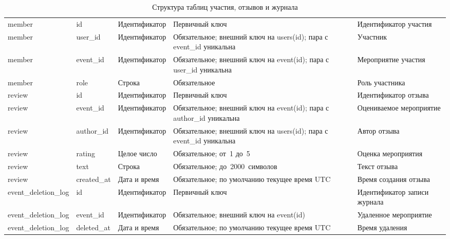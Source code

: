 \begin{table}[H]
    \caption{Структура таблиц участия, отзывов и журнала}
    \label{tab:design-actions}
    \small
    \begin{tabularx}{\textwidth}{|L{3.2cm}|L{2.8cm}|L{2.7cm}|Y|Y|}
        \hline
         &  &  &  &  \\
        \hline
        member & id & Идентификатор & Первичный ключ & Идентификатор участия \\
        \hline
        member & user\_id & Идентификатор & Обязательное; внешний ключ на users(id); пара с event\_id уникальна & Участник \\
        \hline
        member & event\_id & Идентификатор & Обязательное; внешний ключ на event(id); пара с user\_id уникальна & Мероприятие участия \\
        \hline
        member & role & Строка & Обязательное & Роль участника \\
        \hline
        review & id & Идентификатор & Первичный ключ & Идентификатор отзыва \\
        \hline
        review & event\_id & Идентификатор & Обязательное; внешний ключ на event(id); пара с author\_id уникальна & Оцениваемое мероприятие \\
        \hline
        review & author\_id & Идентификатор & Обязательное; внешний ключ на users(id); пара с event\_id уникальна & Автор отзыва \\
        \hline
        review & rating & Целое число & Обязательное; от~1 до~5 & Оценка мероприятия \\
        \hline
        review & text & Строка & Обязательное; до~2000~символов & Текст отзыва \\
        \hline
        review & created\_at & Дата и время & Обязательное; по умолчанию текущее время UTC & Время создания отзыва \\
        \hline
        event\_deletion\_log & id & Идентификатор & Первичный ключ & Идентификатор записи журнала \\
        \hline
        event\_deletion\_log & event\_id & Идентификатор & Обязательное; внешний ключ на event(id) & Удаленное мероприятие \\
        \hline
        event\_deletion\_log & deleted\_at & Дата и время & Обязательное; по умолчанию текущее время UTC & Время удаления \\
        \hline
    \end{tabularx}
\end{table}

